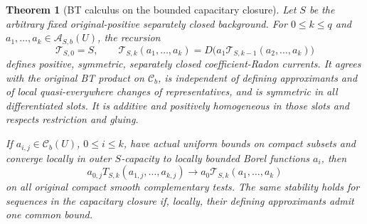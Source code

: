 \documentclass[11pt,a4paper]{article}
\numberwithin{equation}{section}
\newtheorem{theorem}{Theorem}[section]
\theoremstyle{definition}
\theoremstyle{remark}
\newcommand{\Cb}{\mathcal C_b}
\begin{document}
\begin{theorem}[BT calculus on the bounded capacitary closure]
\label{thm:r2-completed-calculus}
Let $S$ be the arbitrary fixed original-positive separately closed
background. For $0\leq k\leq q$ and
$a_1,\ldots,a_k\in\mathcal A_{S,b}(U)$, the recursion
\[
 \mathcal T_{S,0}=S,\qquad
 \mathcal T_{S,k}(a_1,\ldots,a_k)
  =D\bigl(a_1\mathcal T_{S,k-1}(a_2,\ldots,a_k)\bigr)
\]
defines positive, symmetric, separately closed coefficient-Radon
currents. It agrees with the original BT product on $\Cb$,
is independent of defining approximants and of local
quasi-everywhere changes of representatives, and is symmetric in
all differentiated slots. It is additive and positively homogeneous
in those slots and respects restriction and gluing.

If $a_{i,j}\in\Cb(U)$, $0\leq i\leq k$, have actual uniform
bounds on compact subsets and converge locally in outer
$S$-capacity to locally bounded Borel functions $a_i$, then
\begin{equation}
\label{eq:r2-completed-weighted-limit}
 a_{0,j}T_{S,k}(a_{1,j},\ldots,a_{k,j})
 \longrightarrow
 a_0\mathcal T_{S,k}(a_1,\ldots,a_k)
\end{equation}
on all original compact smooth complementary tests. The same
stability holds for sequences in the capacitary closure if, locally,
their defining approximants admit one common bound.
\end{theorem}
\end{document}
